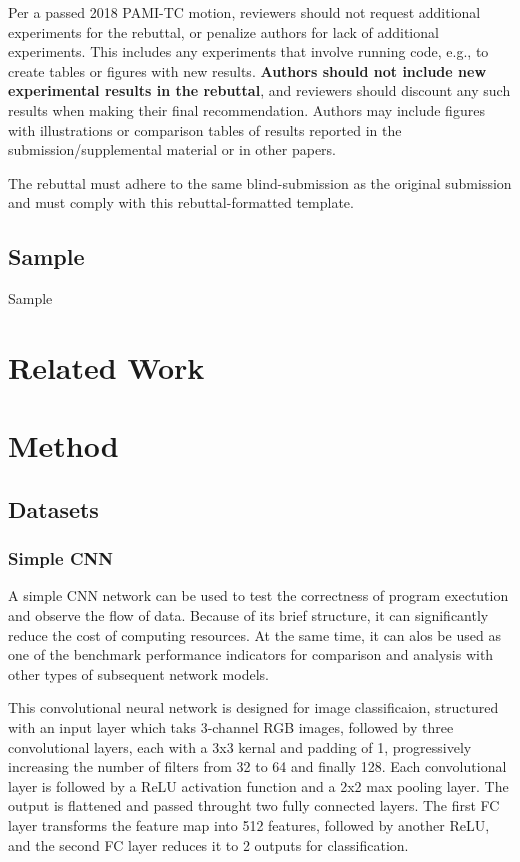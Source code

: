 \documentclass[final]{cvpr}
\begin{document}
Per a passed 2018 PAMI-TC motion, reviewers should not request additional experiments for the rebuttal, or penalize authors for lack of additional experiments. This includes any experiments that involve running code, e.g., to create tables or figures with new results.  \textbf{Authors should not include new experimental results in the rebuttal}, and reviewers should discount any such results when making their final recommendation. Authors may include figures with illustrations or comparison tables of results reported in the submission/supplemental material or in other papers. 

The rebuttal must adhere to the same blind-submission as the original submission and must comply with this rebuttal-formatted template.


\subsection{Sample}
Sample

\section{Related Work}

\section{Method}
\subsection{Datasets}
\cite[Dataset]{kaggledatasetRealAndFakeFaceDetection}

\subsubsection{Simple CNN}

A simple CNN network can be used to test the correctness of program exectution and observe the flow of data. Because of its brief structure, it can significantly reduce the cost of computing resources. At the same time, it can alos be used as one of the benchmark performance indicators for comparison and analysis with other types of subsequent network models.

This convolutional neural network is designed for image classificaion, structured with an input layer which taks 3-channel RGB images, followed by three convolutional layers, each with a 3x3 kernal and padding of 1, progressively increasing the number of filters from 32 to 64 and finally 128. Each convolutional layer is followed by a ReLU activation function and a 2x2 max pooling layer. The output is flattened and passed throught two fully connected layers. The first FC layer transforms the feature map into 512 features, followed by another ReLU, and the second FC layer reduces it to 2 outputs for classification. 
\end{document}
